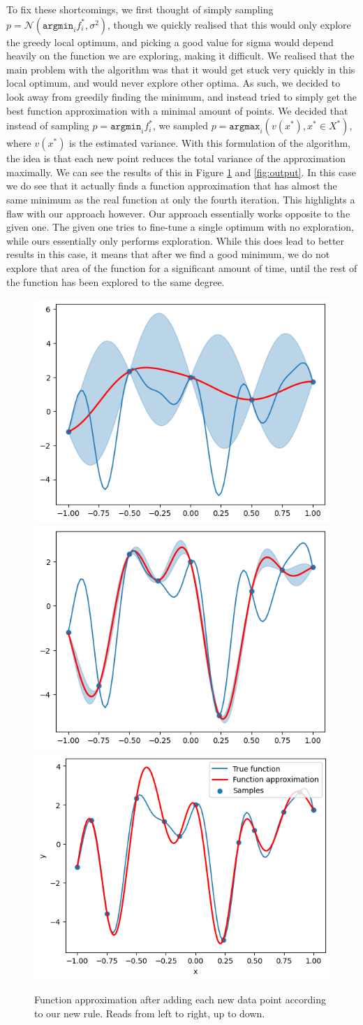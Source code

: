 To fix these shortcomings, we first thought of simply sampling $p = \mathcal{N} \left(\texttt{argmin}_if_i^*, \sigma^2\right)$, though we quickly realised that this would only explore the greedy local optimum, and picking a good value for sigma would depend heavily on the function we are exploring, making it difficult. We realised that the main problem with the algorithm was that it would get stuck very quickly in this local optimum, and would never explore other optima. As such, we decided to look away from greedily finding the minimum, and instead tried to simply get the best function approximation with a minimal amount of points. We decided that instead of sampling $p = \texttt{argmin}_if_i^*$, we sampled $p = \texttt{argmax}_i \left( v(x^*), x^* \in X^* \right)$, where $v(x^*)$ is the estimated variance. With this formulation of the algorithm, the idea is that each new point reduces the total variance of the approximation maximally. We can see the results of this in Figure \ref{fig:iter_new} and \ref{fig:output}. In this case we do see that it actually finds a function approximation that has almost the same minimum as the real function at only the fourth iteration. This highlights a flaw with our approach however. Our approach essentially works opposite to the given one. The given one tries to fine-tune a single optimum with no exploration, while ours essentially only performs exploration. While this does lead to better results in this case, it means that after we find a good minimum, we do not explore that area of the function for a significant amount of time, until the rest of the function has been explored to the same degree.

\begin{figure}[H]
\centering
\includegraphics[width=0.3\linewidth]{images/iter_0.png}
\includegraphics[width=0.3\linewidth]{images/iter_4.png}
\includegraphics[width=0.3\linewidth]{images/output.png}
\caption{Function approximation after adding each new data point according to our new rule. Reads from left to right, up to down.}
\label{fig:iter_new}
\end{figure}


